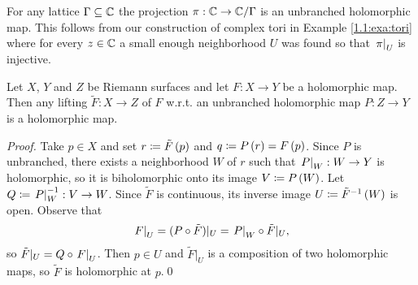 \documentclass[../Moduli_Spaces_of_Riemann_Surfaces.tex]{subfiles}
\begin{document}
    \begin{example}
        For any lattice $\Gamma\subseteq\mathbb{C}$ the projection $\pi:\mathbb{C}\to\mathbb{C}/\Gamma$ is an unbranched holomorphic map. This follows from our construction of complex tori in Example \ref{1.1:exa:tori} where for every $z\in\mathbb{C}$ a small enough neighborhood $U$ was found so that $\left.\pi\right|_U$ is injective.\exqed
    \end{example}
    \begin{proposition}
        Let $X$, $Y$ and $Z$ be Riemann surfaces and let $F:X\to Y$ be a holomorphic map. Then any lifting $\tilde{F}:X\to Z$ of $F$ w.r.t. an unbranched holomorphic map $P:Z\to Y$ is a holomorphic map.
    \end{proposition}
    \vspace{-0.1in}
    \begin{proof}
        Take $p\in X$ and set $r\coloneqq\tilde{F}\left(p\right)$ and $q\coloneqq P\left(r\right)=F\left(p\right)$. Since $P$ is unbranched, there exists a neighborhood $W$ of $r$ such that $\left.P\right|_W:W\to Y$ is holomorphic, so it is biholomorphic onto its image $V\coloneqq P\left(W\right)$. Let $Q\coloneqq\left.P\right|_W^{-1}:V\to W $. Since $\tilde{F}$ is continuous, its inverse image $U\coloneqq\tilde{F}^{-1}\left(W\right)$ is open. Observe that
        \begin{equation*}
            \left.F\right|_U=(P\circ\tilde{F})|_U=\left.P\right|_W\circ\tilde{F}|_U,
        \end{equation*}
        so $\tilde{F}|_U=Q\circ\left.F\right|_U$. Then $p\in U$ and $\tilde{F}|_U$ is a composition of two holomorphic maps, so $\tilde{F}$ is holomorphic at $p$.\qed
    \end{proof}
\end{document}
